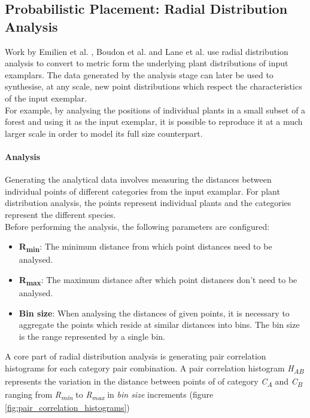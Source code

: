 \subsection{Probabilistic Placement: Radial Distribution Analysis} \label{subsec:prob_placement_radial_dist}

Work by Emilien et al. \cite{Emilien}, Boudon et al. \cite{Boudon2007} and Lane et al. \cite{Lane2002} use radial distribution analysis to convert to metric form the underlying plant distributions of input examplars. The data generated by the analysis stage can later be used to synthesise, at any scale, new point distributions which respect the characteristics of the input exemplar. \\
For example, by analysing the positions of individual plants in a small subset of a forest and using it as the input exemplar, it is possible to reproduce it at a much larger scale in order to model its full size counterpart.\\

\paragraph{Analysis}

Generating the analytical data involves measuring the distances between individual points of different categories from the input examplar. For plant distribution analysis, the points represent individual plants and the categories represent the different species.\\

Before performing the analysis, the following parameters are configured:
\begin{itemize}
\item \textbf{R\textsubscript{min}}: The minimum distance from which point distances need to be analysed.\\
\item \textbf{R\textsubscript{max}}: The maximum distance after which point distances don't need to be analysed.\\
\item \textbf{Bin size}: When analysing the distances of given points, it is necessary to aggregate the points which reside at similar distances into bins. The bin size is the range represented by a single bin.\\
\end{itemize}

A core part of radial distribution analysis is generating pair correlation histograms for each category pair combination. A pair correlation histogram \textit{H\textsubscript{AB}} represents the variation in the distance between points of of category \textit{C\textsubscript{A}} and \textit{C\textsubscript{B}} ranging from \textit{R\textsubscript{min}} to \textit{R\textsubscript{max}} in \textit{bin size} increments (figure \ref{fig:pair_correlation_histograms}) \\

